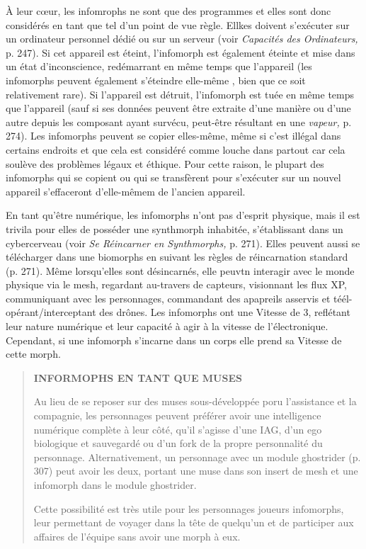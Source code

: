 À leur cœur, les infomrophs ne sont que des programmes et elles sont donc considérés en tant que tel d'un point de vue règle. Ellkes doivent s'exécuter sur un ordinateur personnel dédié ou sur un serveur (voir \textit{Capacités des Ordinateurs,} p. 247). Si cet appareil est éteint, l'infomorph est également éteinte et mise dans un état d'inconscience, redémarrant en même temps que l'appareil (les infomorphs peuvent également s'éteindre elle-même , bien que ce soit relativement rare). Si l'appareil est détruit, l'infomorph est tuée en même temps que l'appareil (sauf si ses données peuvent être extraite d'une manière ou d'une autre depuis les composant ayant survécu, peut-être résultant en une \textit{vapeur,} p. 274). Les infomorphs peuvent se copier elles-même, même si c'est illégal dans certains endroits et que cela est considéré comme louche dans partout car cela soulève des problèmes légaux et éthique. Pour cette raison, le plupart des infomorphs qui se copient ou qui se transfèrent pour s'exécuter sur un nouvel appareil s'effaceront d'elle-mêmem de l'ancien appareil. 

En tant qu'être numérique, les infomorphs n'ont pas d'esprit physique, mais il est trivila pour elles de posséder une synthmorph inhabitée, s'établissant dans un cybercerveau (voir \textit{Se Réincarner en Synthmorphs,} p. 271). Elles peuvent aussi se télécharger dans une biomorphs en suivant les règles de réincarnation standard (p. 271). Même lorsqu'elles sont désincarnés, elle peuvtn interagir avec le monde physique via le mesh, regardant au-travers de capteurs, visionnant les flux XP, communiquant avec les personnages, commandant des apapreils asservis et téél-opérant/interceptant des drônes. Les infomorphs ont une Vitesse de 3, reflétant leur nature numérique et leur capacité à agir à la vitesse de l'électronique. Cependant, si une infomorph s'incarne dans un corps elle prend sa Vitesse de cette morph. 



\begin{quotation} \textbf{INFORMOPHS EN TANT QUE MUSES} 

Au lieu de se reposer sur des muses sous-développée poru l'assistance et la compagnie, les personnages peuvent préférer avoir une intelligence numérique complète à leur côté, qu'il s'agisse d'une IAG, d'un ego biologique et sauvegardé ou d'un fork de la propre personnalité du personnage. Alternativement, un personnage avec un module ghostrider (p. 307) peut avoir les deux, portant une muse dans son insert de mesh et une infomorph dans le module ghostrider. 

Cette possibilité est très utile pour les personnages joueurs infomorphs, leur permettant de voyager dans la tête de quelqu'un et de participer aux affaires de l'équipe sans avoir une morph à eux. \end{quotation} 

